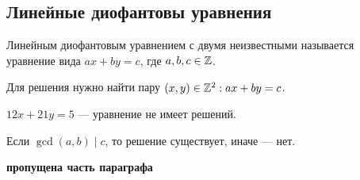 \begin{normalsize}

\section{Линейные диофантовы уравнения}

\begin{defn}
    Линейным диофантовым уравнением с двумя неизвестными называется уравнение вида $ax + by = c$, где $a, b, c \in \mathbb{Z}$.
\end{defn}

Для решения нужно найти пару $(x, y) \in \mathbb{Z}^2: ax + by = c$.

\begin{example}
    $12x + 21y = 5$ --- уравнение не имеет решений.
\end{example}

Если $\gcd(a, b) \mid c$, то решение существует, иначе --- нет.

\textbf{пропущена часть параграфа}

\end{normalsize}